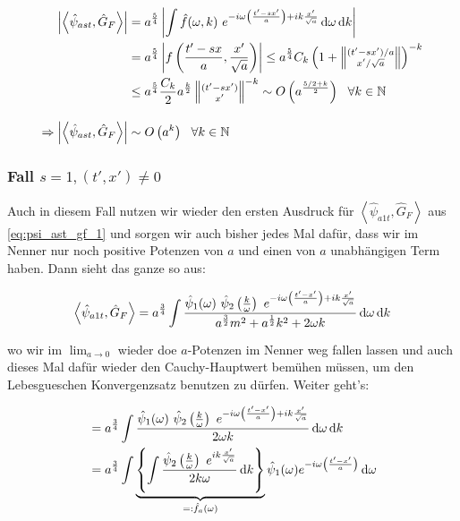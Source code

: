 \begin{align}
    \left| \left< \hat\psi_{ast}, \hat G_F \right> \right|
    &=
    a^{\frac{5}{4}} \left|  \int \hat f(\omega, k)
    ~e^{-i \omega \left(\frac{t'-sx'}{a}\right) + ik \frac{x'}{\sqrt{a}}}
    \mathop{}\!\mathrm{d} \omega \mathop{}\!\mathrm{d} k
    \right|
    \nonumber \\
    &=
    a^{\frac{5}{4}} \left| f \left(\frac{t'-sx}{a}, \frac{x'}{\sqrt{a}}\right) \right|
    \leq
    a^{\frac{5}{4}} C_k\left(
    1 + \left\lVert \substack{(t'-sx')/a \\ x'/\sqrt{a}} \right\rVert
    \right)^{-k}
    \nonumber \\
    &\leq
    a^{\frac{5}{4}} \frac{C_k}{2} a^{\frac{k}{2}} \left\lVert
    \substack{(t'-sx') \\ x'} \right\rVert^{-k}
    \sim O\left(a^{\frac{5/2+k}{2}}\right) ~~ \forall k \in \mathbb{N}
    \nonumber \\[1em]
    \Rightarrow
     \left| \left< \hat\psi_{ast}, \hat G_F \right> \right|
     &\sim
     O\left(a^k\right) ~~ \forall k \in \mathbb{N}
     \label{eq:gf_s_neq=1_xt_neq_0}
\end{align}


\subsubsection*{Fall $s = 1, (t', x') \neq 0$}
Auch in diesem Fall nutzen wir wieder den ersten Ausdruck für
$\left< \hat\psi_{a1t}, \hat G_F \right>$ aus \eqref{eq:psi_ast_gf_1} und sorgen
wir auch bisher jedes Mal dafür, dass wir im Nenner nur noch positive Potenzen von
$a$ und einen von $a$ unabhängigen Term haben. Dann sieht das ganze so aus:

\begin{equation*}
    \left< \hat\psi_{a1t}, \hat G_F \right>
    =
    a^{\frac{3}{4}} \int \frac{\hat \psi_1(\omega)
    ~\hat\psi_2 \left(\frac{k}{\omega}\right)
    ~ e^{-i \omega \left(\frac{t'-x'}{a}\right) + i k \frac{x'}{\sqrt{a}}}
    }
    {
        a^{\frac{3}{2}} m^2 + a^{\frac{1}{2}} k^2 + 2 \omega k
    }
    \mathop{}\!\mathrm{d} \omega \mathop{}\!\mathrm{d} k
\end{equation*}

wo wir im $\lim_{a \rightarrow 0}$ wieder doe $a$-Potenzen im Nenner weg fallen lassen
und auch dieses Mal dafür wieder den Cauchy-Hauptwert bemühen müssen, um den
Lebesgueschen Konvergenzsatz benutzen zu dürfen.
Weiter geht's:

\begin{align}
    &=
    a^{\frac{3}{4}} \int \frac{
    \hat \psi_1(\omega)
    ~\hat\psi_2 \left(\frac{k}{\omega}\right)
    ~ e^{-i \omega \left(\frac{t'-x'}{a}\right) + i k \frac{x'}{\sqrt{a}}}
    }
    {
    2\omega k
    } \mathop{}\!\mathrm{d} \omega \mathop{}\!\mathrm{d} k \nonumber \\
    &= a^{\frac{3}{4}} \int
    \underbrace{\left\{ \int \frac{\hat \psi_2\left(\frac{k}{\omega}\right)
        ~e^{ik\frac{x'}{\sqrt{a}}}
        }
        {
            2 k \omega
        }
        \mathop{}\!\mathrm{d} k
        \right\}}_{=: \hat f_a (\omega)}
    \hat \psi_1(\omega) e^{-i \omega \left(\frac{t'-x'}{a}\right)}
    \mathop{}\!\mathrm{d} \omega
\end{align}

